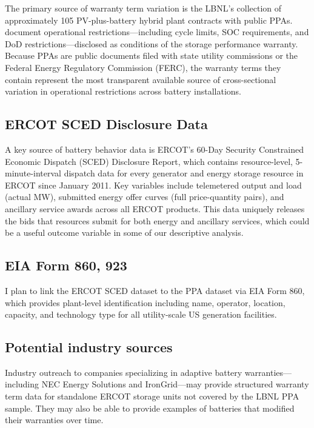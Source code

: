 \documentclass[12pt]{article}
\begin{document}
The primary source of warranty term variation is the LBNL's collection of approximately 105 PV-plus-battery hybrid plant contracts with public PPAs. \citet{seel2021} document operational restrictions---including cycle limits, SOC requirements, and DoD restrictions---disclosed as conditions of the storage performance warranty. Because PPAs are public documents filed with state utility commissions or the Federal Energy Regulatory Commission (FERC), the warranty terms they contain represent the most transparent available source of cross-sectional variation in operational restrictions across battery installations.





\subsection{ERCOT SCED Disclosure Data}

A key source of battery behavior data is ERCOT's 60-Day Security Constrained Economic Dispatch (SCED) Disclosure Report, which contains resource-level, 5-minute-interval dispatch data for every generator and energy storage resource in ERCOT since January 2011. Key variables include telemetered output and load (actual MW), submitted energy offer curves (full price-quantity pairs), and ancillary service awards across all ERCOT products. This data uniquely releases the bids that resources submit for both energy and ancillary services, which could be a useful outcome variable in some of our descriptive analysis. 

\subsection{EIA Form 860, 923}

I plan to link the ERCOT SCED dataset to the PPA dataset via EIA Form 860, which provides plant-level identification including name, operator, location, capacity, and technology type for all utility-scale US generation facilities.

\subsection{Potential industry sources}
Industry outreach to companies specializing in adaptive battery warranties---including NEC Energy Solutions and IronGrid---may provide structured warranty term data for standalone ERCOT storage units not covered by the LBNL PPA sample. They may also be able to provide examples of batteries that modified their warranties over time. 
\end{document}
